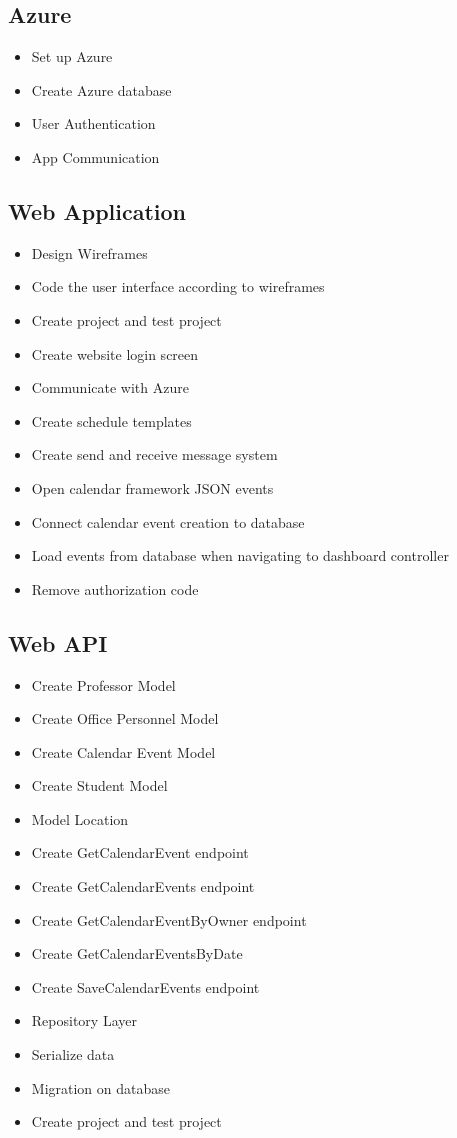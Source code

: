 \documentclass{article}
\begin{document}
{\subsection*{Azure}
\begin{itemize}
\item Set up Azure
\item Create Azure database
\item User Authentication
\item App Communication
\end{itemize}

\subsection*{Web Application}
\begin{itemize}
\item Design Wireframes
\item Code the user interface according to wireframes
\item Create project and test project
\item Create website login screen
\item Communicate with Azure
\item Create schedule templates
\item Create send and receive message system
\item Open calendar framework JSON events
\item Connect calendar event creation to database
\item Load events from database when navigating to dashboard controller
\item Remove authorization code
\end{itemize}

\subsection*{Web API}
\begin{itemize}
\item Create Professor Model
\item Create Office Personnel Model
\item Create Calendar Event Model
\item Create Student Model
\item Model Location
\item Create GetCalendarEvent endpoint
\item Create GetCalendarEvents endpoint
\item Create GetCalendarEventByOwner endpoint
\item Create GetCalendarEventsByDate
\item Create SaveCalendarEvents endpoint
\item Repository Layer
\item Serialize data
\item Migration on database
	\item Create project and test project
\end{itemize}

}
\end{document}
